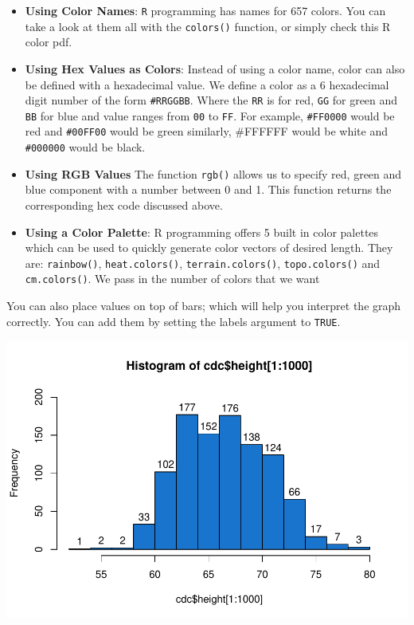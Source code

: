 \documentclass[
]{book}
\newenvironment{Shaded}{\begin{snugshade}}{\end{snugshade}}
\newcommand{\DataTypeTok}[1]{\textcolor[rgb]{0.13,0.29,0.53}{#1}}
\newcommand{\DecValTok}[1]{\textcolor[rgb]{0.00,0.00,0.81}{#1}}
\newcommand{\KeywordTok}[1]{\textcolor[rgb]{0.13,0.29,0.53}{\textbf{#1}}}
\newcommand{\NormalTok}[1]{#1}
\newcommand{\OperatorTok}[1]{\textcolor[rgb]{0.81,0.36,0.00}{\textbf{#1}}}
\newcommand{\OtherTok}[1]{\textcolor[rgb]{0.56,0.35,0.01}{#1}}
\newcommand{\StringTok}[1]{\textcolor[rgb]{0.31,0.60,0.02}{#1}}
\begin{document}
\begin{itemize}
\item
  \textbf{Using Color Names}: \texttt{R} programming has names for 657 colors. You can take a look at them all with the \texttt{colors()} function, or simply check this R color pdf.
\item
  \textbf{Using Hex Values as Colors}: Instead of using a color name, color can also be defined with a hexadecimal value. We define a color as a 6 hexadecimal digit number of the form \texttt{\#RRGGBB}. Where the \texttt{RR} is for red, \texttt{GG} for green and \texttt{BB} for blue and value ranges from \texttt{00} to \texttt{FF}. For example, \texttt{\#FF0000} would be red and \texttt{\#00FF00} would be green similarly, \#FFFFFF would be white and \texttt{\#000000} would be black.
\item
  \textbf{Using RGB Values} The function \texttt{rgb()} allows us to specify red, green and blue component with a number between 0 and 1. This function returns the corresponding hex code discussed above.
\item
  \textbf{Using a Color Palette}: R programming offers 5 built in color palettes which can be used to quickly generate color vectors of desired length. They are: \texttt{rainbow()}, \texttt{heat.colors()}, \texttt{terrain.colors()}, \texttt{topo.colors()} and \texttt{cm.colors()}. We pass in the number of colors that we want
\end{itemize}

You can also place values on top of bars; which will help you interpret the graph correctly. You can add them by setting the labels argument to \texttt{TRUE}.

\begin{Shaded}
\end{Shaded}

\includegraphics{_main_files/figure-latex/unnamed-chunk-131-1.pdf}
\end{document}
